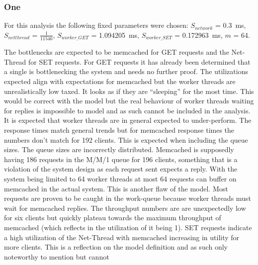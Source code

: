             \subsubsection{One \mw{}\label{subsubsec:7_noq_one-mw}}

                For this analysis the following fixed parameters were chosen: $S_{network}$ =
                \SI{0.3}{\milli\second}, $S_{netthread}$ = $\tfrac{1}{11546}$, $S_{worker\_GET}$ =
                \SI{1.094205}{\milli\second}, $S_{worker\_SET}$ = \SI{0.172963}{\milli\second},
                $m$ = 64.

                The bottlenecks are expected to be memcached for GET requests and the Net-Thread for SET requests. For
                GET requests it has already been determined that a single \srv{} is bottlenecking the system and needs
                no further proof. The utilizations expected align with expectations for memcached but the worker threads
                are unrealistically low taxed. It looks as if they are ``sleeping'' for the most time. This would be
                correct with the model but the real behaviour of worker threads waiting for replies is impossible to
                model and as such cannot be included in the analysis. It is expected that worker threads are in general
                expected to under-perform. The response times match general trends but for memcached response times the
                numbers don't match for 192 clients. This is expected when including the queue sizes. The queue sizes
                are incorrectly distributed. Memcached is supposedly having 186 requests in the M/M/1 queue for 196
                clients, something that is a violation of the system design as each request sent expects a reply. With
                the system being limited to 64 worker threads at most 64 requests can buffer on memcached in the actual
                system. This is another flaw of the model. Most requests are proven to be caught in the work-queue
                because worker threads must wait for memcached replies. The throughput numbers are are unexpectedly low
                for six clients but quickly plateau towards the maximum throughput of memcached (which reflects in the
                utilization of it being 1).\newline
                SET requests indicate a high utilization of the Net-Thread with memcached increasing in utility for more
                clients. This is a reflection on the model definition and as such only noteworthy to mention but cannot

